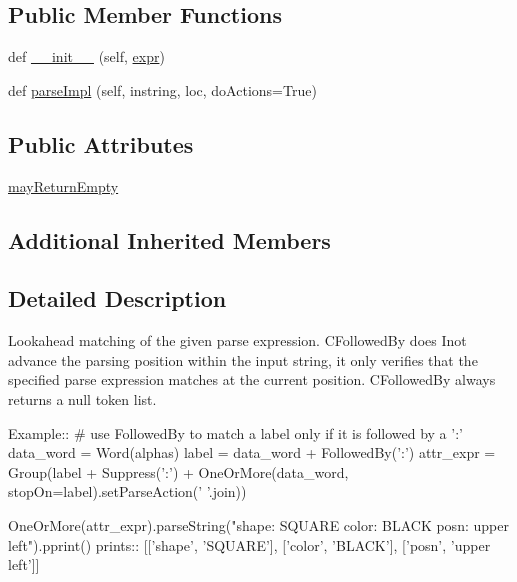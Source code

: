 \subsection*{Public Member Functions}
\begin{DoxyCompactItemize}
\item 
def \hyperlink{classsetuptools_1_1__vendor_1_1pyparsing_1_1FollowedBy_ab11bf746b66b008308751ba04421b142}{\+\_\+\+\_\+init\+\_\+\+\_\+} (self, \hyperlink{classsetuptools_1_1__vendor_1_1pyparsing_1_1ParseElementEnhance_a445450bd765a74cc1d1567e40cade40d}{expr})
\item 
def \hyperlink{classsetuptools_1_1__vendor_1_1pyparsing_1_1FollowedBy_abf358067885516613c5b35ce5447558f}{parse\+Impl} (self, instring, loc, do\+Actions=True)
\end{DoxyCompactItemize}
\subsection*{Public Attributes}
\begin{DoxyCompactItemize}
\item 
\hyperlink{classsetuptools_1_1__vendor_1_1pyparsing_1_1FollowedBy_a534e99b8b37694468a8cca1f4572d589}{may\+Return\+Empty}
\end{DoxyCompactItemize}
\subsection*{Additional Inherited Members}


\subsection{Detailed Description}
\begin{DoxyVerb}Lookahead matching of the given parse expression.  C{FollowedBy}
does I{not} advance the parsing position within the input string, it only
verifies that the specified parse expression matches at the current
position.  C{FollowedBy} always returns a null token list.

Example::
    # use FollowedBy to match a label only if it is followed by a ':'
    data_word = Word(alphas)
    label = data_word + FollowedBy(':')
    attr_expr = Group(label + Suppress(':') + OneOrMore(data_word, stopOn=label).setParseAction(' '.join))
    
    OneOrMore(attr_expr).parseString("shape: SQUARE color: BLACK posn: upper left").pprint()
prints::
    [['shape', 'SQUARE'], ['color', 'BLACK'], ['posn', 'upper left']]
\end{DoxyVerb}
 

